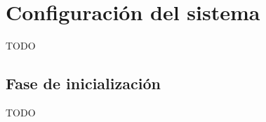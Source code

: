\documentclass[11pt,spanish,listoffigures,listoftables]{tfgetsinf}
\begin{document}

\APPENDIX


\chapter{Configuración del sistema}

TODO

\section{Fase de inicialización}

TODO




\end{document}
